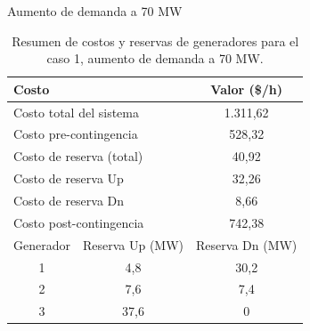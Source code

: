 \begin{frame}{Aumento de demanda a 70 MW}
\small
\begin{table}[H]
    \renewcommand{\arraystretch}{1.3}
    \centering
    \caption{Resumen de costos y reservas de generadores para el caso 1, aumento de demanda a 70 MW.}
    \label{tab:res_ctos_caso1_70}
    \begin{tabular}{|c|c|c|}
		\hline
		\multicolumn{2}{|l|}{Costo} & Valor (\$/h) \\
		\hline
		\multicolumn{2}{|l|}{Costo total del sistema} & 1.311,62 \\
		\multicolumn{2}{|l|}{Costo pre-contingencia} & 528,32 \\
		\multicolumn{2}{|l|}{Costo de reserva (total)} & 40,92 \\
		\multicolumn{2}{|l|}{Costo de reserva Up} & 32,26 \\
		\multicolumn{2}{|l|}{Costo de reserva Dn} & 8,66 \\
		\multicolumn{2}{|l|}{Costo post-contingencia} & 742,38 \\
		\hline \hline
		Generador & Reserva Up (MW) & Reserva Dn (MW) \\
		\hline
		1 & 4,8 & 30,2 \\
		2 & 7,6 & 7,4 \\
		3 & 37,6 & 0 \\
		\hline
	\end{tabular}
	\end{table}

\end{frame}
